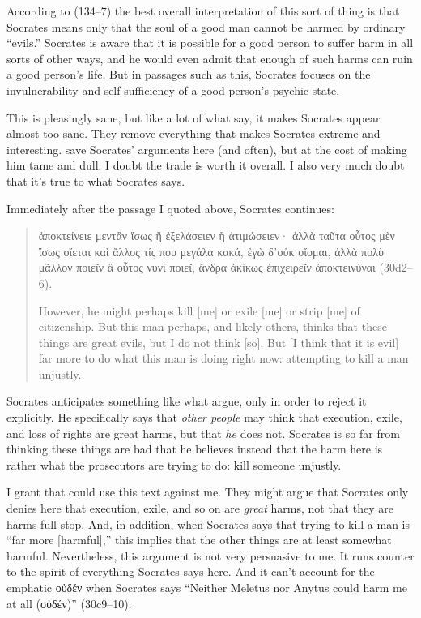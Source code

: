 \documentclass[11pt]{article}
\begin{document}
According to \citet{brickhousesmith2004} (134--7) the best overall interpretation of this sort of thing is that Socrates means only that the soul of a good man cannot be harmed by ordinary ``evils.''  Socrates is aware that it is possible for a good person to suffer harm in all sorts of other ways, and he would even admit that enough of such harms can ruin a good person's life.  But in passages such as this, Socrates focuses on the invulnerability and self-sufficiency of a good person's psychic state.

This is pleasingly sane, but like a lot of what \citeauthor{brickhousesmith2004} say, it makes Socrates appear almost too sane.  They remove everything that makes Socrates extreme and interesting.  \citeauthor{brickhousesmith2004} save Socrates' arguments here (and often), but at the cost of making him tame and dull.  I doubt the trade is worth it overall.  I also very much doubt that it's true to what Socrates says.

Immediately after the passage I quoted above, Socrates continues:

\begin{quote}

    {\g
    ἀποκτείνειε μεντἂν ἴσως ἢ ἐξελάσειεν ἢ ἀτιμώσειεν· ἀλλὰ ταῦτα οὗτος μὲν ἴσως οἴεται καὶ ἄλλος τίς που μεγάλα κακά, ἐγὼ δ᾽οὐκ οἴομαι, ἀλλὰ πολὺ μᾶλλον ποιεῖν ἃ οὗτος νυνὶ ποιεῖ, ἄνδρα ἀκίκως ἐπιχειρεῖν ἀποκτεινύναι
    } (30d2--6).

    However, he might perhaps kill [me] or exile [me] or strip [me] of citizenship. But this man perhaps, and likely others, thinks that these things are great evils, but I do not think [so]. But [I think that it is evil] far more to do what this man is doing right now: attempting to kill a man unjustly.

\end{quote}

Socrates anticipates something like what \citeauthor{brickhousesmith2004} argue, only in order to reject it explicitly.  He specifically says that \emph{other people} may think that execution, exile, and loss of rights are great harms, but that \emph{he} does not.  Socrates is so far from thinking these things are bad that he believes instead that the harm here is rather what the prosecutors are trying to do: kill someone unjustly.

I grant that \citeauthor{brickhousesmith2004} could use this text against me.  They might argue that Socrates only denies here that execution, exile, and so on are \emph{great} harms, not that they are harms full stop.  And, in addition, when Socrates says that trying to kill a man is ``far more [harmful],'' this implies that the other things are at least somewhat harmful.  Nevertheless, this argument is not very persuasive to me.  It runs counter to the spirit of everything Socrates says here. And it can't account for the emphatic {\g οὐδέν} when Socrates says ``Neither Meletus nor Anytus could harm me at all ({\g οὐδέν})'' (30c9--10).
\end{document}
